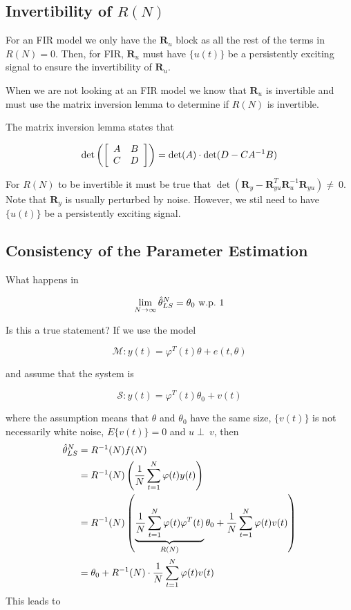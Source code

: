\subsection{Invertibility of $R(N)$}%
\label{sec:upersistent}
For an FIR model we only have the $\mathbf{R}_u$ block as all the rest of the terms in $R(N)=0$.
Then, for FIR, $\mathbf{R}_u$ must have $\{u(t)\}$ be a persistently exciting signal to ensure the invertibility of $\mathbf{R}_u$.

When we are not looking at an FIR model we know that $\mathbf{R}_u$ is invertible and must use the matrix inversion lemma to determine if $R(N)$ is invertible.
\begin{definition}
The matrix inversion lemma states that

\begin{equation*}
\det\left(\left[\begin{array}{c c}A&B\\C&D\end{array}\right]\right) = \det(A) \cdot \det(D-CA^{-1}B)
\end{equation*}

\end{definition}
For $R (N)$ to be invertible it must be true that $\det(\mathbf{R}_y-\mathbf{R}_{yu}^T\mathbf{R}_u^{-1}\mathbf{R}_{yu})\neq~0$.
Note that $\mathbf{R}_y$ is usually perturbed by noise.
However, we stil need to have $\{u (t)\}$ be a persistently exciting signal.

\subsection{Consistency of the Parameter Estimation}%
\label{sec:peconsistency}
What happens in

\begin{equation*}
\lim_{N\to\infty} \hat{\theta}_{LS}^N=\theta_0 \text{~w.p.~} 1
\end{equation*}

Is this a true statement? If we use the model

\begin{equation*}
\mathcal{M}: y (t) = \varphi^T (t)\theta+e (t,\theta)
\end{equation*}

and assume that the system is

\begin{equation*}
\mathcal{S}: y (t) = \varphi^T (t)\theta_0 + v (t)
\end{equation*}

where the assumption means that $\theta$ and $\theta_0$ have the same size, $\{v (t)\}$ is not necessarily white noise, $E\{v (t)\} = 0$ and $u\perp~v$, then
\begin{align}
\label{eq:thn}
\hat{\theta}_{LS}^N &= R^{-1}(N)f(N) \nonumber \\
&= R^{-1}(N)\left(\frac{1}{N}\sum_{t=1}^N\varphi(t)y(t)\right) \nonumber \\
&= R^{-1}(N)\left( \underbrace{\frac{1}{N}\sum_{t=1}^N\varphi(t)\varphi^T(t)}_{R(N)}\theta_0+\frac{1}{N}\sum_{t=1}^N\varphi(t)v(t)\right) \nonumber\\
&= \theta_0 + R^{-1}(N)\cdot \frac{1}{N}\sum_{t=1}^N\varphi(t)v(t)
\end{align}
This leads to

